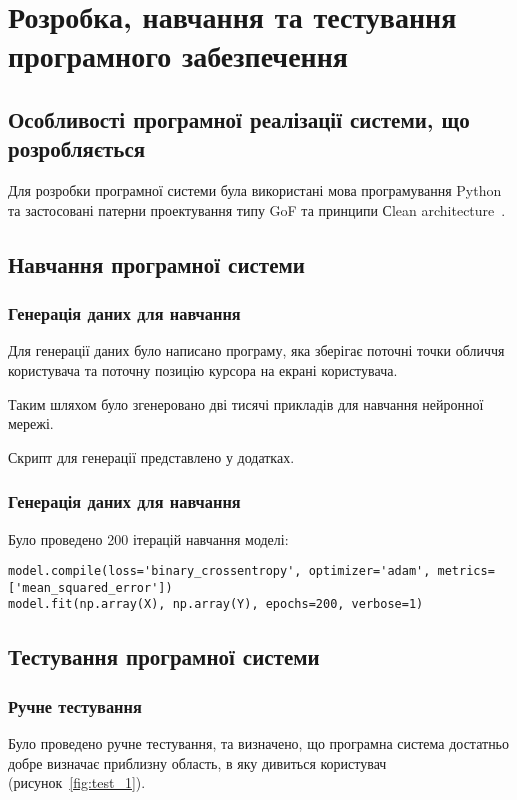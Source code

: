 \section{Розробка, навчання та тестування програмного забезпечення}
\subsection{Особливості програмної реалізації системи, що розробляється}
Для розробки програмної системи була використані мова програмування Python та застосовані патерни проектування типу GoF та принципи Сlean architecture~\cite{Martin2017}.

\subsection{Навчання програмної системи}
\subsubsection{Генерація даних для навчання}
Для генерації даних було написано програму, яка зберігає поточні точки обличчя користувача та поточну позицію курсора на екрані користувача.

Таким шляхом було згенеровано дві тисячі прикладів для навчання нейронної мережі.

Скрипт для генерації представлено у додатках.

\subsubsection{Генерація даних для навчання}
Було проведено 200 ітерацій навчання моделі: 
\begin{lstlisting}
model.compile(loss='binary_crossentropy', optimizer='adam', metrics=['mean_squared_error'])
model.fit(np.array(X), np.array(Y), epochs=200, verbose=1)
\end{lstlisting}

\subsection{Тестування програмної системи}
\subsubsection{Ручне тестування}
Було проведено ручне тестування, та визначено, що програмна система достатньо добре визначає приблизну область, в яку дивиться користувач (рисунок~\ref{fig:test_1}).

